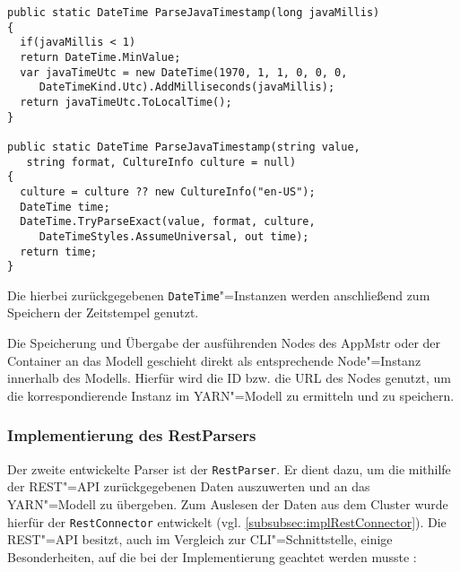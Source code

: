 \begin{lstlisting}[label=lst:parseJavaTimestamp,style=cs,
caption={[Überladungen der Methode ParseJavaTimestamp()]
    Überladungen der Methode \texttt{ParseJavaTimestamp()}.
    Es steht zudem eine weitere Überladung zur Verfügung, um den Timestamp in Form der Millisekunden seit 1970 als \texttt{string} zu übergeben.
    Dabei wird der \texttt{string} in einen \texttt{long} konvertiert und anschließend die erste hier gezeigte Überladung aufgerufen.}]
public static DateTime ParseJavaTimestamp(long javaMillis)
{
  if(javaMillis < 1)
  return DateTime.MinValue;
  var javaTimeUtc = new DateTime(1970, 1, 1, 0, 0, 0,
     DateTimeKind.Utc).AddMilliseconds(javaMillis);
  return javaTimeUtc.ToLocalTime();
}

public static DateTime ParseJavaTimestamp(string value,
   string format, CultureInfo culture = null)
{
  culture = culture ?? new CultureInfo("en-US");
  DateTime time;
  DateTime.TryParseExact(value, format, culture,
     DateTimeStyles.AssumeUniversal, out time);
  return time;
}
\end{lstlisting}

Die hierbei zurückgegebenen \texttt{DateTime}"=Instanzen werden anschließend zum Speichern der Zeitstempel genutzt.

Die Speicherung und Übergabe der ausführenden Nodes des \gls{AppMstr} oder der Container an das Modell geschieht direkt als entsprechende Node"=Instanz innerhalb des Modells.
Hierfür wird die ID bzw. die URL des Nodes genutzt, um die korrespondierende Instanz im YARN"=Modell zu ermitteln und zu speichern.

\subsubsection{Implementierung des RestParsers}
\label{subsubsec:implRestParser}

Der zweite entwickelte Parser ist der \texttt{RestParser}.
Er dient dazu, um die mithilfe der REST"=API zurückgegebenen Daten auszuwerten und an das YARN"=Modell zu übergeben.
Zum Auslesen der Daten aus dem Cluster wurde hierfür der \texttt{RestConnector} entwickelt (vgl. \cref{subsubsec:implRestConnector}).
Die REST"=API besitzt, auch im Vergleich zur \gls{CLI}"=Schnittstelle, einige Besonderheiten, auf die bei der Implementierung geachtet werden musste \cite{HadoopYarnCmds271,HadoopRmApi271,HadoopNmApi271,HadoopYarnTlServer271}:

